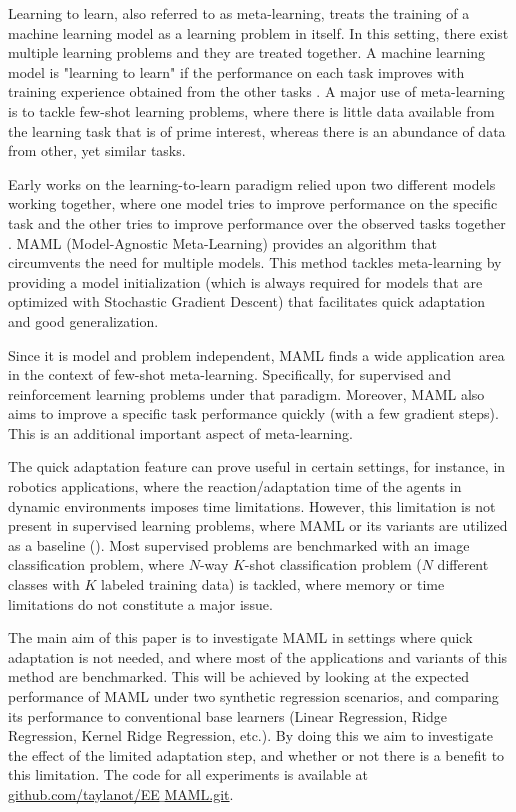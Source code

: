 Learning to learn, also referred to as meta-learning, treats the training of a machine learning model as a learning problem in itself. In this setting, there exist multiple learning problems and they are treated together. A machine learning model is "learning to learn" if the performance on each task improves with training experience obtained from the other tasks \cite{thrun1998}. A major use of meta-learning is to tackle few-shot learning problems, where there is little data available from the learning task that is of prime interest, whereas there is an abundance of data from other, yet similar tasks. 

Early works on the learning-to-learn paradigm relied upon two different models working together, where one model tries to improve performance on the specific task and the other tries to improve performance over the observed tasks together \cite{thrun1998}. MAML (Model-Agnostic Meta-Learning) \cite{finn2017} provides an algorithm that circumvents the need for multiple models. This method tackles meta-learning by providing a model initialization (which is always required for models that are optimized with Stochastic Gradient Descent) that facilitates quick adaptation and good generalization.

Since it is model and problem independent, MAML finds a wide application area in the context of few-shot meta-learning. Specifically, for supervised and reinforcement learning problems under that paradigm. Moreover, MAML also aims to improve a specific task performance quickly (with a few gradient steps). This is an additional important aspect of meta-learning. 


The quick adaptation feature can prove useful in certain settings, for instance, in robotics applications, where the reaction/adaptation time of the agents in dynamic environments imposes time limitations. However, this limitation is not present in supervised learning problems, where MAML or its variants are utilized as a baseline (\eg \cite{flennerhag2019,nichol2018,rajasegaran2020,collins2020,guiroy2019}). Most supervised problems are benchmarked with an image classification problem, where $N$-way $K$-shot classification problem ($N$ different classes with $K$ labeled training data) is tackled, where memory or time limitations do not constitute a major issue.

The main aim of this paper is to investigate MAML in settings where quick adaptation is not needed, and where most of the applications and variants of this method are benchmarked. This will be achieved by looking at the expected performance of MAML under two synthetic regression scenarios, and comparing its performance to conventional base learners (\eg Linear Regression, Ridge Regression, Kernel Ridge Regression, etc.). By doing this we aim to investigate the effect of the limited adaptation step, and whether or not there is a benefit to this limitation. The code for all experiments is available at \href{https://github.com/taylanot/EE_MAML.git}{github.com/taylanot/EE$\_$MAML.git}. 
